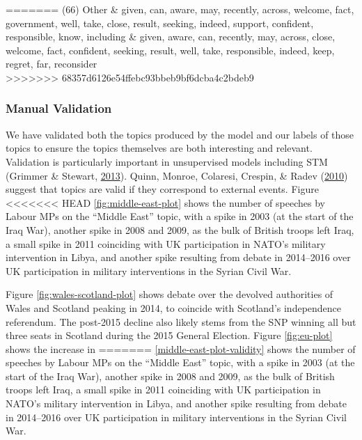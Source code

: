 \documentclass[]{article}
\theoremstyle{definition}
\theoremstyle{definition}
\theoremstyle{definition}
\theoremstyle{remark}
\begin{document}
\begin{table}[H]
\begin{table}[H]
\begin{table}[H]
\begin{table}[H]
\begin{table}[H]
\begin{table}[H]
\begin{table}[H]
\begin{table}[H]
\begin{longtabu}
=======
(66) Other & given, can, aware, may, recently, across, welcome, fact, government, well, take, close, result, seeking, indeed, support, confident, responsible, know, including & given, aware, can, recently, may, across, close, welcome, fact, confident, seeking, result, well, take, responsible, indeed, keep, regret, far, reconsider\\
\bottomrule
>>>>>>> 68357d6126e54ffebc93bbeb9bf6dcba4c2bdeb9
\end{longtabu}

\hypertarget{manual-validation}{%
\subsubsection{Manual Validation}\label{manual-validation}}

We have validated both the topics produced by the model and our labels
of those topics to ensure the topics themselves are both interesting and
relevant. Validation is particularly important in unsupervised models
including STM (Grimmer \& Stewart,
\protect\hyperlink{ref-grimmer2013}{2013}). Quinn, Monroe, Colaresi,
Crespin, \& Radev (\protect\hyperlink{ref-quinn2010}{2010}) suggest that
topics are valid if they correspond to external events. Figure
<<<<<<< HEAD
\ref{fig:middle-east-plot} shows the number of speeches by Labour MPs on
the ``Middle East'' topic, with a spike in 2003 (at the start of the
Iraq War), another spike in 2008 and 2009, as the bulk of British troops
left Iraq, a small spike in 2011 coinciding with UK participation in
NATO's military intervention in Libya, and another spike resulting from
debate in 2014--2016 over UK participation in military interventions in
the Syrian Civil War.

Figure \ref{fig:wales-scotland-plot} shows debate over the devolved
authorities of Wales and Scotland peaking in 2014, to coincide with
Scotland's independence referendum. The post-2015 decline also likely
stems from the SNP winning all but three seats in Scotland during the
2015 General Election. Figure \ref{fig:eu-plot} shows the increase in
=======
\ref{middle-east-plot-validity} shows the number of speeches by Labour
MPs on the ``Middle East'' topic, with a spike in 2003 (at the start of
the Iraq War), another spike in 2008 and 2009, as the bulk of British
troops left Iraq, a small spike in 2011 coinciding with UK participation
in NATO's military intervention in Libya, and another spike resulting
from debate in 2014--2016 over UK participation in military
interventions in the Syrian Civil War.


\end{table}
\end{table}
\end{table}
\end{table}
\end{table}
\end{table}
\end{table}
\end{table}
\end{document}
